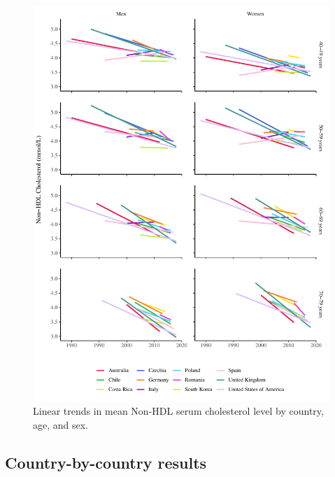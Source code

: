 \documentclass[12pt]{article}
\begin{document}
\begin{appendix}
    \begin{figure}[H]
        \centering
        \includegraphics[width=\linewidth]{../3_figures/figS_mean_chol_trends.pdf}
        \caption{Linear trends in mean Non-HDL serum cholesterol level by country, age, and sex.}
        \label{fig:trends}
    \end{figure}


    \subsection{Country-by-country results}


\end{appendix}
\end{document}
